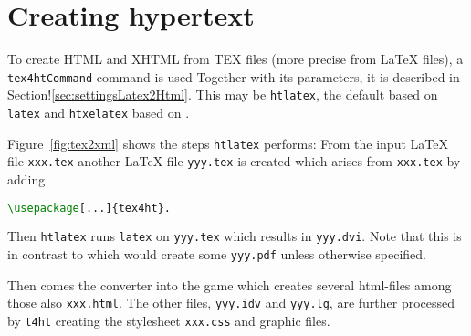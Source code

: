 








\section{Creating hypertext}\label{sec:tex2html}

To create HTML and XHTML from TEX files (more precise from \LaTeX{} files), 
a \texttt{tex4htCommand}-command is used 
Together with its parameters, 
it is described in Section!\ref{sec:settingsLatex2Html}. 
This may be \texttt{htlatex}, the default based on \texttt{latex} 
and \texttt{htxelatex} based on \xelatex. 

Figure~\ref{fig:tex2xml} shows the steps \texttt{htlatex} performs: 
From the input \LaTeX{} file \texttt{xxx.tex} 
another \LaTeX{} file \texttt{yyy.tex} is created 
which arises from \texttt{xxx.tex} by adding 
\begin{lstlisting}[language=TeX]
\usepackage[...]{tex4ht}. 
\end{lstlisting}
%
Then \texttt{htlatex} runs \texttt{latex} on \texttt{yyy.tex} 
which results in \texttt{yyy.dvi}. 
Note that this is in contrast to \lualatex{} 
which would create some \texttt{yyy.pdf} unless otherwise specified. 

Then comes the converter  into the game 
which creates several html-files among those also \texttt{xxx.html}. 
The other files, \texttt{yyy.idv} and \texttt{yyy.lg}, 
are further processed by \texttt{t4ht} 
creating the stylesheet \texttt{xxx.css} and graphic files. 
\medskip


